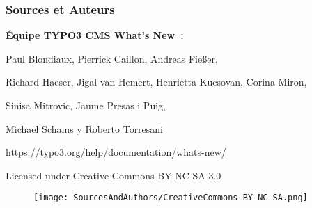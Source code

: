 
\begin{frame}[fragile]
	\frametitle{Sources et Auteurs}

	\vspace{-0.6cm}

	\centerline{\textbf{Équipe TYPO3 CMS What's New~:}}

	\begin{center}
		\centerline{Paul Blondiaux, Pierrick Caillon, Andreas Fießer,}
		\centerline{Richard Haeser, Jigal van Hemert, Henrietta Kucsovan, Corina Miron,}
		\centerline{Sinisa Mitrovic, Jaume Presas i Puig,}
		\centerline{Michael Schams y Roberto Torresani}
	\end{center}

	\vspace{0.3cm}

	\smaller\begin{center}\url{https://typo3.org/help/documentation/whats-new/}\end{center}\normalsize

	\vspace{1cm}

	\smaller\begin{center}Licensed under Creative Commons BY-NC-SA 3.0\end{center}\normalsize
	\begin{figure}\vspace*{-0.4cm}
		\texttt{[image: SourcesAndAuthors/CreativeCommons-BY-NC-SA.png]}
	\end{figure}

\end{frame}

